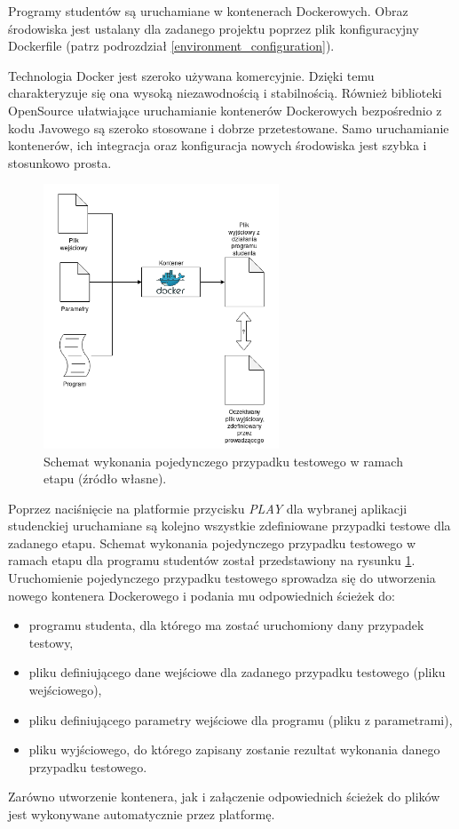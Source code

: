 Programy studentów są uruchamiane w kontenerach Dockerowych.
Obraz środowiska jest ustalany dla zadanego projektu poprzez plik konfiguracyjny Dockerfile (patrz podrozdział \ref{environment_configuration}).

Technologia Docker jest szeroko używana komercyjnie.
Dzięki temu charakteryzuje się ona wysoką niezawodnością i stabilnością.
Również biblioteki OpenSource ułatwiające uruchamianie kontenerów Dockerowych bezpośrednio z kodu Javowego są szeroko stosowane i dobrze przetestowane.
Samo uruchamianie kontenerów, ich integracja oraz konfiguracja nowych środowiska jest szybka i stosunkowo prosta.

\begin{figure}[h]
    \centering
    \includegraphics[width = 7cm]{chapter05/single_test_case.png}
    \caption{Schemat wykonania pojedynczego przypadku testowego w ramach etapu (źródło własne).}
    \label{fig:single-test-case}
\end{figure}

Poprzez naciśnięcie na platformie przycisku \textit{PLAY} dla wybranej aplikacji studenckiej uruchamiane są kolejno wszystkie zdefiniowane przypadki testowe dla zadanego etapu.
Schemat wykonania pojedynczego przypadku testowego w ramach etapu dla programu studentów został przedstawiony na rysunku \ref{fig:single-test-case}.
Uruchomienie pojedynczego przypadku testowego sprowadza się do utworzenia nowego kontenera Dockerowego i podania mu odpowiednich ścieżek do:
\begin{itemize}
    \item programu studenta, dla którego ma zostać uruchomiony dany przypadek testowy,
    \item pliku definiującego dane wejściowe dla zadanego przypadku testowego (pliku wejściowego),
    \item pliku definiującego parametry wejściowe dla programu (pliku z parametrami),
    \item pliku wyjściowego, do którego zapisany zostanie rezultat wykonania danego przypadku testowego.
\end{itemize}
Zarówno utworzenie kontenera, jak i załączenie odpowiednich ścieżek do plików jest wykonywane automatycznie przez platformę.

